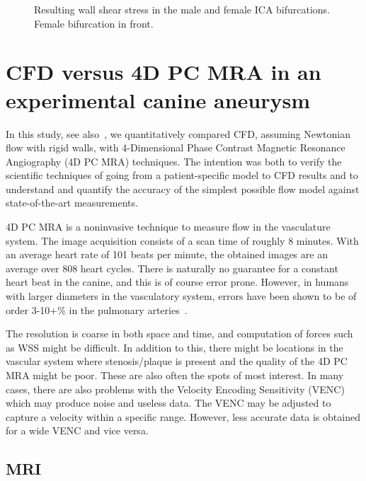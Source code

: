 \begin{figure}
  \begin{center}
    \caption{Resulting wall shear stress in the male and female ICA
      bifurcations. Female bifurcation in front.}
    \label{fig:ica_wss_res}
  \end{center}
\end{figure}

\section{CFD versus 4D PC MRA in an experimental canine aneurysm} \label{dog_study}

In this study, see also~\cite{doggy}, we quantitatively compared CFD,
assuming Newtonian flow with rigid walls, with 4-Dimensional Phase
Contrast Magnetic Resonance Angiography (4D PC MRA) techniques. The
intention was both to verify the scientific techniques of going from a
patient-specific model to CFD results and to understand and quantify
the accuracy of the simplest possible flow model against
state-of-the-art measurements.

4D PC MRA is a noninvasive technique to measure flow in the
vasculature system. The image acquisition consists of a scan time of
roughly 8 minutes. With an average heart rate of 101 beats per minute,
the obtained images are an average over 808 heart cycles. There is
naturally no guarantee for a constant heart beat in the canine, and
this is of course error prone. However, in humans with larger
diameters in the vasculatory system, errors have been shown to be of
order 3-10+\% in the pulmonary arteries~\cite{JoachimLotz,EvansAJ}.

The resolution is coarse in both space and time, and computation of
forces such as WSS might be difficult. In addition to this, there
might be locations in the vascular system where stenosis/plaque is
present and the quality of the 4D PC MRA might be poor. These are
also often the spots of most interest. In many cases, there are also
problems with the Velocity Encoding Sensitivity (VENC) which may
produce noise and useless data. The VENC may be adjusted to capture a
velocity within a specific range. However, less accurate data is
obtained for a wide VENC and vice versa.

\subsection{MRI}

